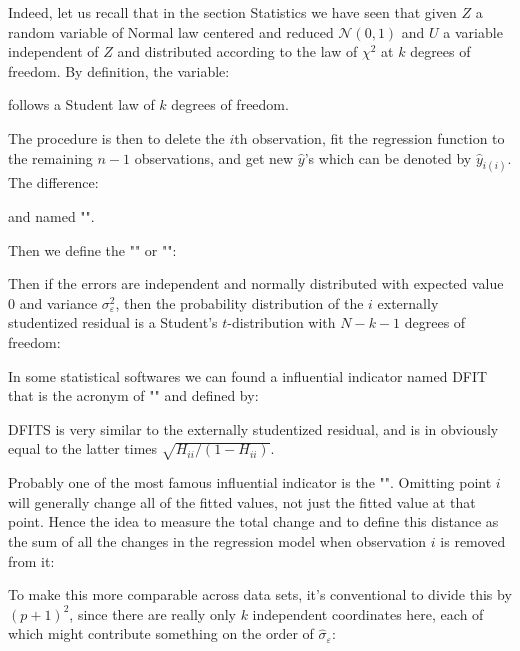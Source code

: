 	\begin{tcolorbox}[title=Remark,colframe=black,arc=10pt]
	Indeed, let us recall that in the section Statistics we have seen that given $Z$ a random variable of Normal law centered and reduced $\mathcal{N}(0,1)$ and $U$ a variable independent of $Z$ and distributed according to the law of $\chi^2$ at $k$ degrees of freedom. By definition, the variable:
	
	follows a Student law of $k$ degrees of freedom.
	\end{tcolorbox}
	 The procedure is then to delete the $i$th observation, fit the regression function to the remaining $n-1$ observations, and get new $\hat{y}$'s which can be denoted by $\hat{y}_{i(i)}$. The difference:
	
	and named "". 
	
	Then we define the "" or "":
	
	Then if the errors are independent and normally distributed with expected value $0$ and variance $\sigma^2_\varepsilon$, then the probability distribution of the $i$ externally studentized residual is a Student's $t$-distribution with $N-k-1$ degrees of freedom:
	
	
	\begin{tcolorbox}[title=Remark,colframe=black,arc=10pt]
	In some statistical softwares we can found a influential indicator named DFIT that is the acronym of "" and defined by:
	
	DFITS is very similar to the externally studentized residual, and is in obviously equal to the latter times $\sqrt{H_{ii}/(1-H_{ii})}$.
	\end{tcolorbox}
	Probably one of the most famous influential indicator is the "". Omitting point $i$ will generally change all of the fitted values, not just the fitted value at that point. Hence the idea to measure the total change and to define this distance as the sum of all the changes in the regression model when observation $i$ is removed from it:
	
	To make this more comparable across data sets, it's conventional to divide this by $(p + 1)^2$, since there are really only $k$ independent coordinates here, each of which might contribute something on the order of $\hat{\sigma}_{\varepsilon}$:
	
